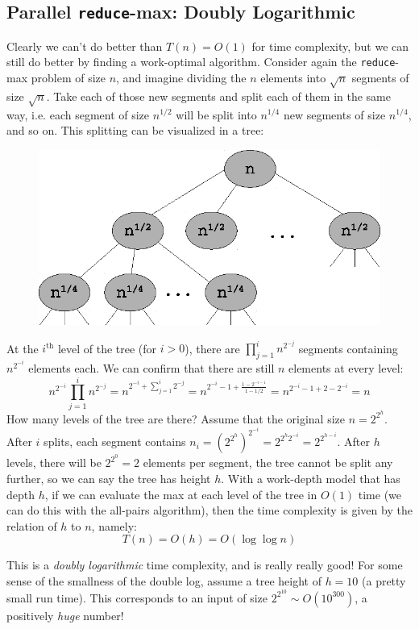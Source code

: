 \documentclass[twoside]{article}
\begin{document}
\subsection{Parallel \texttt{reduce}-max: Doubly Logarithmic}
Clearly we can't do better than $T(n) = O(1)$ for time complexity, but we can still do better by finding a work-optimal algorithm. Consider again the \texttt{reduce}-max problem of size $n$, and imagine dividing the $n$ elements into $\sqrt{n}$ segments of size $\sqrt{n}$. Take each of those new segments and split each of them in the same way, i.e. each segment of size $n^{1/2}$ will be split into $n^{1/4}$ new segments of size $n^{1/4}$, and so on. This splitting can be visualized in a tree:
\begin{figure}[h]
\center
\includegraphics[scale=1]{img/doublelogtree.eps}
\end{figure}

At the $i^{\text{th}}$ level of the tree (for $i>0$), there are $\prod_{j=1}^{i}n^{2^{-j}}$ segments containing $n^{2^{-i}}$ elements each. We can confirm that there are still $n$ elements at every level:
\[
n^{2^{-i}}\prod_{j=1}^{i}n^{2^{-j}} = n^{2^{-i} + \sum_{j=1}^{i}2^{-j}} = n^{2^{-i} - 1 + \frac{1-2^{-i-1}}{1-1/2}} = n^{2^{-i}-1+2-2^{-i}} = n
\]
How many levels of the tree are there? Assume that the original size $n=2^{2^{h}}$. After $i$ splits, each segment contains $n_i = (2^{2^{h}})^{2^{-i}} = 2^{2^{h}2^{-i}} = 2^{2^{h-i}}$. After $h$ levels, there will be $2^{2^{0}}=2$ elements per segment, the tree cannot be split any further, so we can say the tree has height $h$. With a work-depth model that has depth $h$, if we can evaluate the max at each level of the tree in $O(1)$ time (we can do this with the all-pairs algorithm), then the time complexity is given by the relation of $h$ to $n$, namely:
\[
T(n) = O(h) = O(\log \log n)
\]

This is a \textit{doubly logarithmic} time complexity, and is really really good! For some sense of the smallness of the double log, assume a tree height of $h=10$ (a pretty small run time). This corresponds to an input of size $2^{2^{10}} \sim O(10^{300})$, a positively \textit{huge} number! 
\end{document}
